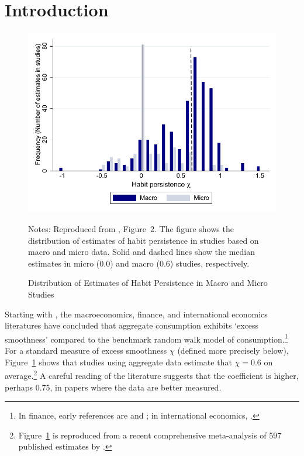 \documentclass[titlepage]{./econtex}
\begin{document}


\section{Introduction}\label{sec:introduction}


\begin{figure}
  \centering
\caption{Distribution of Estimates of Habit Persistence in Macro and Micro Studies}
\label{microMacroMetaHistogram}
    { \includegraphics[width=1.0\textwidth]{./Figures/microMacroMetaHistogram}}

    \begin{flushleft}
      \footnotesize Notes: Reproduced from \cite{hrsHabit}, Figure~2. The figure shows the distribution of estimates of habit persistence in studies based on macro and micro data. Solid and dashed lines show the median estimates in micro (0.0) and macro (0.6) studies, respectively.
      \end{flushleft}
\end{figure}

Starting with \cite{cdSmooth}, the macroeconomics, finance, and international economics literatures have concluded that aggregate consumption exhibits `excess smoothness' compared to the benchmark \cite{hallRandomWalk} random walk model of consumption.\footnote{In finance, early references are \cite{abel:aerhabits} and \cite{constantinidesHabits}; in international economics, \cite{gru04}.}  For a standard measure of excess smoothness $\chi$ (defined more precisely below), Figure~\ref{microMacroMetaHistogram} shows that studies using aggregate data estimate that $\chi=0.6$ on average.\footnote{Figure~\ref{microMacroMetaHistogram} is reproduced from a recent comprehensive meta-analysis of 597 published estimates by \cite{hrsHabit}.} A careful reading of the literature suggests that the coefficient is higher, perhaps 0.75, in papers where the data are better measured.
\end{document}
